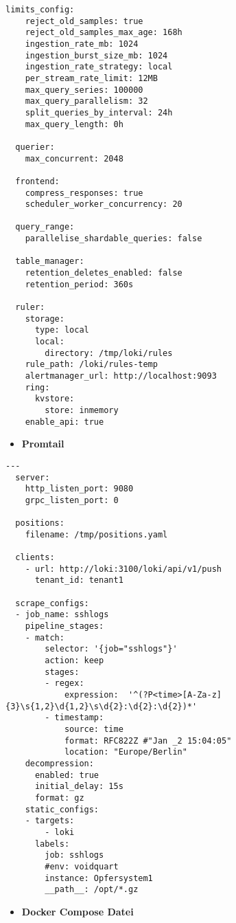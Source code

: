 {\begin{Verbatim}[frame=single]
  limits_config:
    reject_old_samples: true
    reject_old_samples_max_age: 168h
    ingestion_rate_mb: 1024
    ingestion_burst_size_mb: 1024
    ingestion_rate_strategy: local
    per_stream_rate_limit: 12MB
    max_query_series: 100000
    max_query_parallelism: 32
    split_queries_by_interval: 24h
    max_query_length: 0h
  
  querier:
    max_concurrent: 2048
  
  frontend:
    compress_responses: true
    scheduler_worker_concurrency: 20
  
  query_range:
    parallelise_shardable_queries: false
  
  table_manager:
    retention_deletes_enabled: false
    retention_period: 360s
  
  ruler:
    storage:
      type: local
      local:
        directory: /tmp/loki/rules
    rule_path: /loki/rules-temp
    alertmanager_url: http://localhost:9093
    ring:
      kvstore:
        store: inmemory
    enable_api: true
\end{Verbatim}
}

\begin{itemize}[noitemsep]
    \item \textbf{Promtail} 
\end{itemize}

{
\begin{Verbatim}[frame=single]
  ---
  server:
    http_listen_port: 9080
    grpc_listen_port: 0
  
  positions:
    filename: /tmp/positions.yaml
  
  clients:
    - url: http://loki:3100/loki/api/v1/push
      tenant_id: tenant1
  
  scrape_configs:
  - job_name: sshlogs
    pipeline_stages:
    - match:
        selector: '{job="sshlogs"}'
        action: keep
        stages:
        - regex:
            expression:  '^(?P<time>[A-Za-z]{3}\s{1,2}\d{1,2}\s\d{2}:\d{2}:\d{2})*'
        - timestamp:
            source: time
            format: RFC822Z #"Jan _2 15:04:05"
            location: "Europe/Berlin"
    decompression:
      enabled: true
      initial_delay: 15s
      format: gz
    static_configs:
    - targets:
        - loki
      labels:
        job: sshlogs
        #env: voidquart
        instance: Opfersystem1
        __path__: /opt/*.gz
\end{Verbatim}
}

\newpage
\begin{itemize}[noitemsep]
    \item \textbf{Docker Compose Datei} 
\end{itemize}

